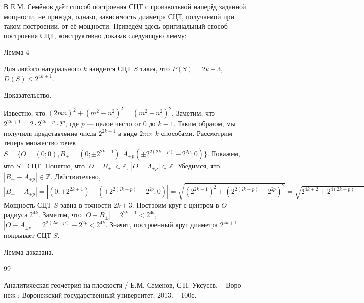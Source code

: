 \documentclass[a4paper,14pt]{article}
\newcommand{\Z}{\mathbb{Z}}
\begin{document}
В \cite{angem1kurs} Е.М. Семёнов даёт способ построения СЦТ с произвольной наперёд заданной мощности, не приводя, однако, зависимость диаметра СЦТ, получаемой при таком построении, от её мощности.
Приведём здесь оригинальный способ построения СЦТ, конструктивно доказав следующую лемму:

Лемма 4.

Для любого натурального $k$ найдётся СЦТ $S$ такая, что $P(S)=2k+3$, $D(S)\leq 2^{4k+1}$.

Доказательство.

Известно, что $(2mn)^2+(m^2-n^2)^2=(m^2+n^2)^2$.
Заметим, что $2^{2k+1} = 2 \cdot 2^{2k-p} \cdot 2^p$, где $p$ --- целое число от $0$ до $k-1$.
Таким образом, мы получили представление числа $2^{2k+1}$ в виде $2mn$ $k$ способами.
Рассмотрим теперь множество точек $S=\{O=(0;0),B_\pm=(0;\pm 2^{2k+1}),A_{\pm p}(\pm 2^{2(2k-p)}-2^{2p};0)\}$.
Покажем, что $S$ - СЦТ.
Понятно, что $|O-B_\pm|\in\Z$, $|O-A_{\pm p}|\in\Z$.
Убедимся, что $|B_\pm-A_{\pm p}|\in\Z$.
Действительно, $|B_\pm-A_{\pm p}|=|(0;\pm 2^{2k+1}) - (\pm 2^{2(2k-p)}-2^{2p};0)| = \sqrt{(2^{2k+1})^2+(2^{2(2k-p)}-2^{2p})^2}=
\sqrt{2^{4k+2}+2^{4(2k-p)}-2\cdot 2^{4k}+2^4p}=\sqrt{2^{4(2k-p)}+2\cdot 2^{4k}+2^4p}=2^{2(2k-p)}+2^{2p}\in\Z$
Мощность СЦТ $S$ равна в точности $2k+3$.
Построим круг с центром в $O$ радиуса $2^{4k}$.
Заметим, что $|O-B_\pm|=2^{2k+1}<2^{4k}$, $|O-A_{\pm p}| = 2^{2(2k-p)}-2^{2p} < 2^{4k}$.
Значит, построенный круг диаметра $2^{4k+1}$ покрывает СЦТ $S$.

Лемма доказана.


\begin{thebibliography}{99}

 Аналитическая геометрия на плоскости / Е.М. Семенов, С.Н. Уксусов. – Воро-неж : Воронежский государственный университет, 2013. – 100с.

\end{thebibliography}
\end{document}
